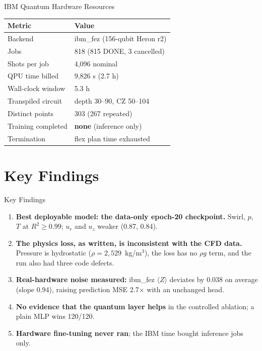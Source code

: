 \documentclass[aspectratio=169]{beamer}
\begin{document}
\begin{frame}{IBM Quantum Hardware Resources}
\begin{table}
\centering
\small
\begin{tabular}{ll}
\toprule
Metric & Value \\
\midrule
Backend & ibm\_fez (156-qubit Heron r2) \\
Jobs & 818 (815 DONE, 3 cancelled) \\
Shots per job & 4,096 nominal \\
QPU time billed & 9,826 s (2.7 h) \\
Wall-clock window & 5.3 h \\
Transpiled circuit & depth 30--90, CZ 50--104 \\
Distinct points & 303 (267 repeated) \\
Training completed & \textbf{none} (inference only) \\
Termination & flex plan time exhausted \\
\bottomrule
\end{tabular}
\end{table}
\end{frame}

\section{Key Findings}

\begin{frame}{Key Findings}
\begin{enumerate}
  \item \textbf{Best deployable model: the data-only epoch-20 checkpoint.} Swirl, $p$, $T$ at $R^2\ge0.99$; $u_r$ and $u_z$ weaker (0.87, 0.84).
  \item \textbf{The physics loss, as written, is inconsistent with the CFD data.} Pressure is hydrostatic ($\rho=2{,}529$~kg/m$^3$), the loss has no $\rho g$ term, and the run also had three code defects.
  \item \textbf{Real-hardware noise measured:} ibm\_fez $\langle Z\rangle$ deviates by 0.038 on average (slope 0.94), raising prediction MSE 2.7$\times$ with an unchanged head.
  \item \textbf{No evidence that the quantum layer helps} in the controlled ablation; a plain MLP wins 120/120.
  \item \textbf{Hardware fine-tuning never ran}; the IBM time bought inference jobs only.
\end{enumerate}
\end{frame}
\end{document}
